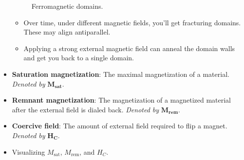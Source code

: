 \documentclass[../notes.tex]{subfiles}
\begin{document}
\begin{itemize}
\begin{figure}[h!]
        \caption{Ferromagnetic domains.}
        \label{fig:FMdomains}
    \end{figure}
    \begin{itemize}
        \item Over time, under different magnetic fields, you'll get fracturing domains. These may align antiparallel.
        \item Applying a strong external magnetic field can anneal the domain walls and get you back to a single domain.
    \end{itemize}
    \item \textbf{Saturation magnetization}: The maximal magnetization of a material. \emph{Denoted by} $\bm{M_\textbf{sat}}$.
    \item \textbf{Remnant magnetization}: The magnetization of a magnetized material after the external field is dialed back. \emph{Denoted by} $\bm{M_\textbf{rem}}$.
    \item \textbf{Coercive field}: The amount of external field required to flip a magnet. \emph{Denoted by} $\bm{H_C}$.
    \item Visualizing $M_\text{sat}$, $M_\text{rem}$, and $H_C$.
    \begin{figure}[h!]
        \centering
\end{figure}
\end{itemize}
\end{document}
